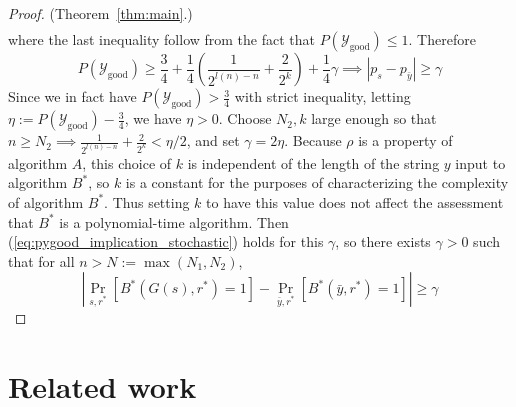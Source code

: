 \documentclass{article}
\def \Ygood{\mathcal{Y}_\text{good}}
\def \by{{\bar{y}}}
\theoremstyle{definition}
\theoremstyle{remark}
\begin{document}
\begin{proof}{(Theorem~\ref{thm:main}.)}
\begin{multline}
\end{multline}
where the last inequality follow from the fact that $P(\Ygood) \leq 1$.
Therefore
\begin{equation} \label{eq:pygood_implication_stochastic}
P(\Ygood) \geq \frac{3}{4} + \frac{1}{4}(\frac{1}{2^{l(n) - n}} + \frac{2}{2^k}) + \frac{1}{4} \gamma \implies |p_s - p_\by| \geq \gamma
\end{equation}
Since we in fact have $P(\Ygood) > \frac{3}{4}$ with strict inequality,
letting $\eta := P(\Ygood) - \frac{3}{4}$, we have $\eta > 0$.
Choose $N_2, k$ large enough so that $n \geq N_2 \implies \frac{1}{2^{l(n) - n}} + \frac{2}{2^k} < \eta/2$, and set $\gamma = 2\eta$.
Because $\rho$ is a property of algorithm $A$, this choice of $k$ is independent of the length of the string $y$ input to algorithm $B^*$, so $k$ is a constant for the purposes of characterizing the complexity of algorithm $B^*$.
Thus setting $k$ to have this value does not affect the assessment that $B^*$ is a polynomial-time algorithm.
Then (\ref{eq:pygood_implication_stochastic}) holds for this $\gamma$, so there exists $\gamma > 0$ such that for all $n > N := \max(N_1, N_2)$,
$$
|\Pr_{s, r^*}[B^*(G(s), r^*) = 1] - \Pr_{\by, r^*}[B^*(\by, r^*) = 1]| \geq \gamma
$$

\end{proof}

\section{Related work}
\end{document}
